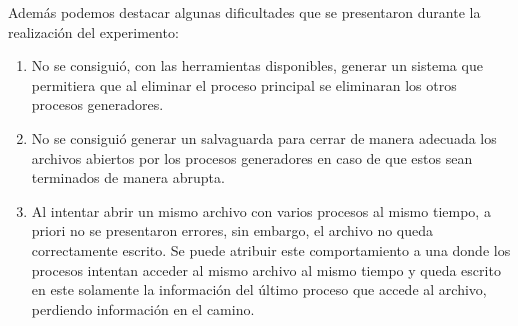 Además podemos destacar algunas dificultades que se presentaron durante la realización del experimento:
\begin{enumerate}
    \item No se consiguió, con las herramientas disponibles, generar un sistema que permitiera que al eliminar el proceso principal se eliminaran los otros procesos generadores.
    \item No se consiguió generar un salvaguarda para cerrar de manera adecuada los archivos abiertos por los procesos generadores en caso de que estos sean terminados de manera abrupta.
    \item Al intentar abrir un mismo archivo con varios procesos al mismo tiempo, a priori no se presentaron errores, sin embargo, el archivo no queda correctamente escrito. Se puede atribuir este comportamiento a una  donde los procesos intentan acceder al mismo archivo al mismo tiempo y queda escrito en este solamente la información del último proceso que accede al archivo, perdiendo información en el camino.
\end{enumerate}